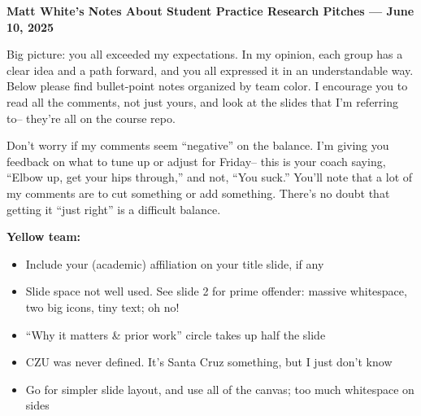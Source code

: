 \documentclass[12pt,pdftex,letterpaper]{article}
\begin{document}
\begin{center}
	\textbf{Matt White's Notes About Student Practice Research Pitches --- June 10, 2025 }
\end{center}

Big picture: you all exceeded my expectations. In my opinion, each group has a clear idea and a path forward, and you all expressed it in an understandable way. Below please find bullet-point notes organized by team color. I encourage you to read all the comments, not just yours, and look at the slides that I'm referring to-- they're all on the course repo.

Don't worry if my comments seem ``negative'' on the balance. I'm giving you feedback on what to tune up or adjust for Friday-- this is your coach saying, ``Elbow up, get your hips through,'' and not, ``You suck.'' You'll note that a lot of my comments are to cut something or add something. There's no doubt that getting it ``just right'' is a difficult balance.

\vspace{0.5cm}

\noindent \textbf{Yellow team:}
\begin{itemize}
	\item Include your (academic) affiliation on your title slide, if any
	
	\item Slide space not well used. See slide 2 for prime offender: massive whitespace, two big icons, tiny text; oh no!
	
	\item ``Why it matters \& prior work'' circle takes up half the slide
	
	\item CZU was never defined. It's Santa Cruz something, but I just don't know
	
	\item Go for simpler slide layout, and use all of the canvas; too much whitespace on sides
\end{itemize}

\vspace{0.5cm}
\end{document}

